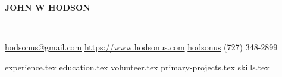 \documentclass[11pt]{article}
\newcommand*{\sectiondir}{sections/}
\newcommand*{\headerspace}{\vspace{.05cm}}
\begin{document}
	\noindent\centerline{ \huge\textbf{JOHN W HODSON} }\\
	\headerspace

	\noindent
	\faEnvelopeSquare \space \href{mailto:hodsonus@gmail.com}{hodsonus@gmail.com} \hspace*{\fill}
	\faHome \space \href{https://www.hodsonus.com}{https://www.hodsonus.com} \hspace*{\fill}
	\faGithub \space \href{https://github.com/hodsonus}{hodsonus} \hspace*{\fill}
	\faMobilePhone \space (727) 348-2899\\
	\headerspace

	{experience.tex}
	{education.tex}
	{volunteer.tex}
	{primary-projects.tex}
	{skills.tex}
\end{document}
